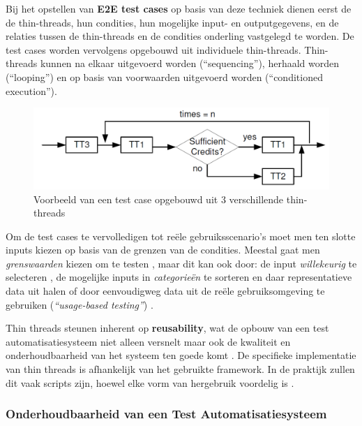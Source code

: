 Bij het opstellen van \textbf{E2E test cases} op basis van deze techniek dienen eerst de de thin-threads, hun condities, hun mogelijke input- en outputgegevens, en de relaties tussen de thin-threads en de condities onderling vastgelegd te worden. De test cases worden vervolgens opgebouwd uit individuele thin-threads. Thin-threads kunnen na elkaar uitgevoerd worden (``sequencing''), herhaald worden (``looping'') en op basis van voorwaarden uitgevoerd worden (``conditioned execution'').

\begin{figure}[h!]
    \centering
    \includegraphics[scale=0.35]{img/Tsai2001ComplexTestScenario.png}
    \caption{Voorbeeld van een test case opgebouwd uit 3 verschillende thin-threads \autocite{Tsai2001}}
    \label{fig:tsaicomplexscenario}
\end{figure}

Om de test cases te vervolledigen tot reële gebruiksscenario's moet men ten slotte inputs kiezen op basis van de grenzen van de condities. Meestal gaat men \emph{grenswaarden} kiezen om te testen \autocite{Jorgensen2013}, maar dit kan ook door: de input \emph{willekeurig} te selecteren \autocite{Loo1988}, de mogelijke inputs in \emph{categorieën} te sorteren en daar representatieve data uit halen of door eenvoudigweg data uit de reële gebruiksomgeving te gebruiken (\emph{``usage-based testing''}) \autocite{Dyer1992}.

Thin threads steunen inherent op \textbf{reusability}, wat de opbouw van een test automatisatiesysteem niet alleen versnelt maar ook de kwaliteit en onderhoudbaarheid van het systeem ten goede komt \autocite{LombardHill2014}. De specifieke implementatie van thin threads is afhankelijk van het gebruikte framework. In de praktijk zullen dit vaak scripts zijn, hoewel elke vorm van hergebruik voordelig is \autocite{Madan2013} \autocite{Barrett2013}.

\subsubsection{Onderhoudbaarheid van een Test Automatisatiesysteem}

